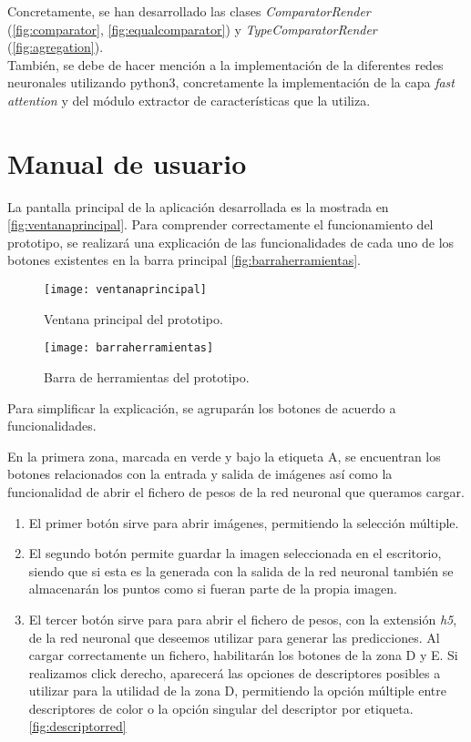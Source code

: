 Concretamente, se han desarrollado las clases \emph{ComparatorRender} (\autoref{fig:comparator}, \autoref{fig:equalcomparator}) y \emph{TypeComparatorRender} (\autoref{fig:agregation}).\\

También, se debe de hacer mención a la implementación de la diferentes redes neuronales utilizando python3, concretamente la implementación de la capa \emph{fast attention} y del módulo extractor de características que la utiliza.


\chapter{Manual de usuario}

La pantalla principal de la aplicación desarrollada es la mostrada en \autoref{fig:ventanaprincipal}. Para comprender correctamente el funcionamiento del prototipo, se realizará una explicación de las funcionalidades de cada uno de los botones existentes en la barra principal \autoref{fig:barraherramientas}.\\

\begin{figure}[htpb]
  \centering
  \texttt{[image: ventanaprincipal]}
  \caption{Ventana principal del prototipo.}
  \label{fig:ventanaprincipal}
\end{figure}

\begin{figure}[htpb]
  \centering
  \texttt{[image: barraherramientas]}
  \caption{Barra de herramientas del prototipo.}
  \label{fig:barraherramientas}
\end{figure}

Para simplificar la explicación, se agruparán los botones de acuerdo a funcionalidades.\\

\newpage

En la primera zona, marcada en verde y bajo la etiqueta A, se encuentran los botones relacionados con la entrada y salida de imágenes así como la funcionalidad de abrir el fichero de pesos de la red neuronal que queramos cargar.

\begin{enumerate}
\item El primer botón sirve para abrir imágenes, permitiendo la selección múltiple.
\item El segundo botón permite guardar la imagen seleccionada en el escritorio, siendo que si esta es la generada con la salida de la red neuronal también se almacenarán los puntos como si fueran parte de la propia imagen.
\item El tercer botón sirve para para abrir el fichero de pesos, con la extensión \emph{h5}, de la red neuronal que deseemos utilizar para generar las predicciones. Al cargar correctamente un fichero, habilitarán los botones de la zona D y E. Si realizamos click derecho, aparecerá las opciones de descriptores posibles a utilizar para la utilidad de la zona D, permitiendo la opción múltiple entre descriptores de color o la opción singular del descriptor por etiqueta. \autoref{fig:descriptorred}
\end{enumerate}

